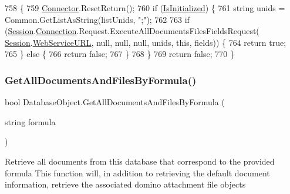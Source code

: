 \begin{DoxyCode}
758                                                                                         \{
759         \mbox{\hyperlink{class_connector}{Connector}}.ResetReturn();
760         \textcolor{keywordflow}{if} (\mbox{\hyperlink{class_database_object_a5fe036d32a30eb10d1b3f6a30263f740}{IsInitialized}}) \{
761             \textcolor{keywordtype}{string} unids = Common.GetListAsString(listUnids, \textcolor{stringliteral}{";"});
762 
763             \textcolor{keywordflow}{if} (\mbox{\hyperlink{class_database_object_aa8484162b7d2a7c4c9426bca13c64c07}{Session}}.\mbox{\hyperlink{class_session_object_a014bdbf705a753540e19bfb53030c55c}{Connection}}.Request.ExecuteAllDocumentsFilesFieldsRequest(
      \mbox{\hyperlink{class_database_object_aa8484162b7d2a7c4c9426bca13c64c07}{Session}}.\mbox{\hyperlink{class_session_object_a697c071c812fbf7ad1166b896fb44c16}{WebServiceURL}}, null, null, null, unids, \textcolor{keyword}{this}, fields)) \{
764                 \textcolor{keywordflow}{return} \textcolor{keyword}{true};
765             \} \textcolor{keywordflow}{else} \{
766                 \textcolor{keywordflow}{return} \textcolor{keyword}{false};
767             \}
768         \}
769         \textcolor{keywordflow}{return} \textcolor{keyword}{false};
770     \}
\end{DoxyCode}
\mbox{\label{class_database_object_ac478ff9264805edc8569d510916c4c00}} 
\subsubsection{\texorpdfstring{Get\+All\+Documents\+And\+Files\+By\+Formula()}{GetAllDocumentsAndFilesByFormula()}}
{\footnotesize\ttfamily bool Database\+Object.\+Get\+All\+Documents\+And\+Files\+By\+Formula (\begin{DoxyParamCaption}\item[{string}]{formula }\end{DoxyParamCaption})}



Retrieve all documents from this database that correspond to the provided formula This function will, in addition to retrieving the default document information, retrieve the associated domino attachment file objects 

